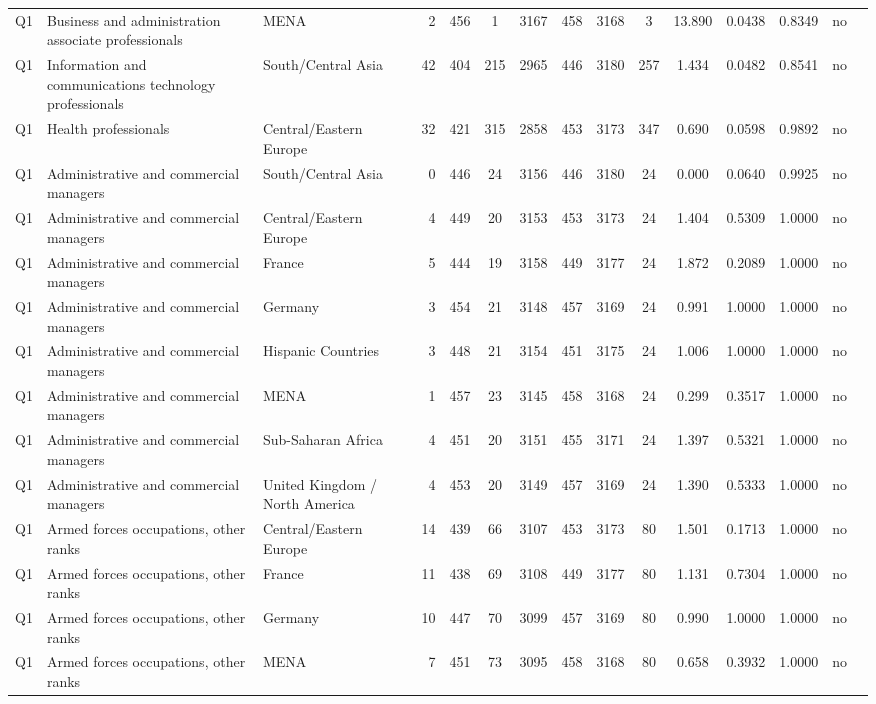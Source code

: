 \begin{longtable}{lllrcccccccccll}
Q1 & Business and administration associate professionals & MENA & 2 & 456 & 1 & 3167 & 458 & 3168 & 3 & 13.890 & 0.0438 & 0.8349 & no \\
Q1 & Information and communications technology professionals & South/Central Asia & 42 & 404 & 215 & 2965 & 446 & 3180 & 257 & 1.434 & 0.0482 & 0.8541 & no \\
Q1 & Health professionals & Central/Eastern Europe & 32 & 421 & 315 & 2858 & 453 & 3173 & 347 & 0.690 & 0.0598 & 0.9892 & no \\
Q1 & Administrative and commercial managers & South/Central Asia & 0 & 446 & 24 & 3156 & 446 & 3180 & 24 & 0.000 & 0.0640 & 0.9925 & no \\
Q1 & Administrative and commercial managers & Central/Eastern Europe & 4 & 449 & 20 & 3153 & 453 & 3173 & 24 & 1.404 & 0.5309 & 1.0000 & no \\
Q1 & Administrative and commercial managers & France & 5 & 444 & 19 & 3158 & 449 & 3177 & 24 & 1.872 & 0.2089 & 1.0000 & no \\
Q1 & Administrative and commercial managers & Germany & 3 & 454 & 21 & 3148 & 457 & 3169 & 24 & 0.991 & 1.0000 & 1.0000 & no \\
Q1 & Administrative and commercial managers & Hispanic Countries & 3 & 448 & 21 & 3154 & 451 & 3175 & 24 & 1.006 & 1.0000 & 1.0000 & no \\
Q1 & Administrative and commercial managers & MENA & 1 & 457 & 23 & 3145 & 458 & 3168 & 24 & 0.299 & 0.3517 & 1.0000 & no \\
Q1 & Administrative and commercial managers & Sub-Saharan Africa & 4 & 451 & 20 & 3151 & 455 & 3171 & 24 & 1.397 & 0.5321 & 1.0000 & no \\
Q1 & Administrative and commercial managers & United Kingdom / North America & 4 & 453 & 20 & 3149 & 457 & 3169 & 24 & 1.390 & 0.5333 & 1.0000 & no \\
Q1 & Armed forces occupations, other ranks & Central/Eastern Europe & 14 & 439 & 66 & 3107 & 453 & 3173 & 80 & 1.501 & 0.1713 & 1.0000 & no \\
Q1 & Armed forces occupations, other ranks & France & 11 & 438 & 69 & 3108 & 449 & 3177 & 80 & 1.131 & 0.7304 & 1.0000 & no \\
Q1 & Armed forces occupations, other ranks & Germany & 10 & 447 & 70 & 3099 & 457 & 3169 & 80 & 0.990 & 1.0000 & 1.0000 & no \\
Q1 & Armed forces occupations, other ranks & MENA & 7 & 451 & 73 & 3095 & 458 & 3168 & 80 & 0.658 & 0.3932 & 1.0000 & no \\

\end{longtable}
